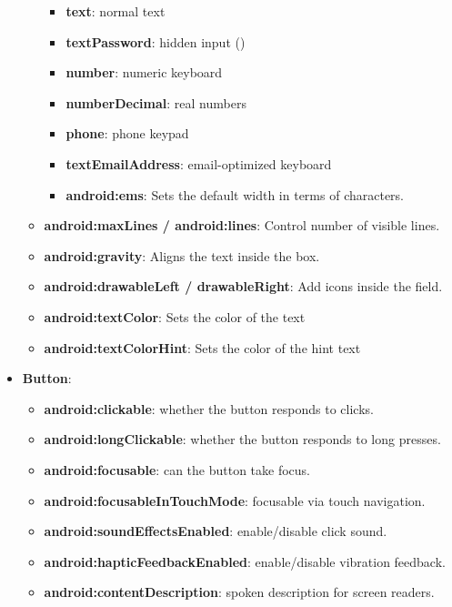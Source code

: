 \documentclass{report}
\begin{document}
\begin{itemize}
\begin{itemize}
\begin{itemize}
                    \item \textbf{text}: normal text
                    \item \textbf{textPassword}: hidden input (\bullet\bullet\bullet\bullet)
                    \item \textbf{number}: numeric keyboard
                    \item \textbf{numberDecimal}: real numbers
                    \item \textbf{phone}: phone keypad
                    \item \textbf{textEmailAddress}: email-optimized keyboard
                    \item \textbf{android:ems}: Sets the default width in terms of characters.
                \end{itemize}
                \item \textbf{android:maxLines / android:lines}: Control number of visible lines.
                \item \textbf{android:gravity}: Aligns the text inside the box.
                \item \textbf{android:drawableLeft / drawableRight}: Add icons inside the field.
                \item \textbf{android:textColor}: Sets the color of the text
                \item \textbf{android:textColorHint}: Sets the color of the hint text
            \end{itemize}
        \item \textbf{Button}:
            \begin{itemize}
                \item \textbf{android:clickable}: whether the button responds to clicks.
                \item \textbf{android:longClickable}: whether the button responds to long presses.
                \item \textbf{android:focusable}: can the button take focus.
                \item \textbf{android:focusableInTouchMode}: focusable via touch navigation.
                \item \textbf{android:soundEffectsEnabled}: enable/disable click sound.
                \item \textbf{android:hapticFeedbackEnabled}: enable/disable vibration feedback.
                \item \textbf{android:contentDescription}: spoken description for screen readers.

\end{itemize}
\end{itemize}
\end{document}
